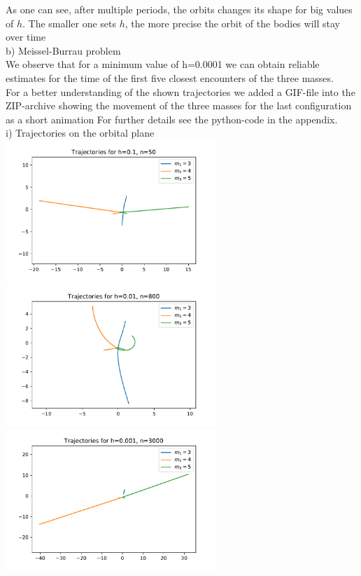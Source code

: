 \documentclass[12pt,a4paper]{article}
\begin{document}
\newline
As one can see, after multiple periods, the orbits changes its shape for big values of $h$. The smaller one sets $h$, the more precise the orbit of the bodies will stay over time\\
\newline
b) Meissel-Burrau problem\\
\newline
We observe that for a minimum value of h=0.0001 we can obtain reliable estimates for the time of the first five closest encounters of the three masses.\\
For a better understanding of the shown trajectories we added a GIF-file into the ZIP-archive showing the movement of the three masses for the last configuration as a short animation 
For further details see the python-code in the appendix.\\
\newpage
i) Trajectories on the orbital plane\\
\includegraphics[width=8cm]{b_h_1.pdf}
\includegraphics[width=8cm]{b_h_01.pdf}\\
\includegraphics[width=8cm]{b_h_001.pdf}
\end{document}
